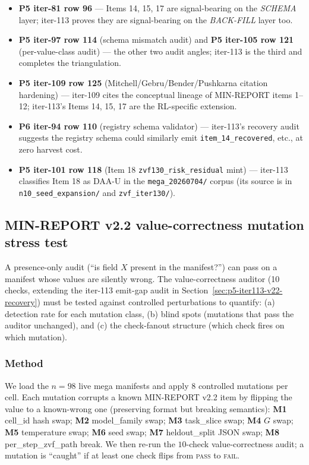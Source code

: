 \documentclass{article}  \usepackage[preprint,nonatbib]{neurips_2026} \usepackage[numbers]{natbib}
\begin{document}
\begin{itemize}
  \item \textbf{P5 iter-81 row 96} --- Items 14, 15, 17 are
        signal-bearing on the \emph{SCHEMA} layer; iter-113 proves they
        are signal-bearing on the \emph{BACK-FILL} layer too.
  \item \textbf{P5 iter-97 row 114} (schema mismatch audit) and
        \textbf{P5 iter-105 row 121} (per-value-class audit) --- the
        other two audit angles; iter-113 is the third and completes
        the triangulation.
  \item \textbf{P5 iter-109 row 125} (Mitchell/Gebru/Bender/Pushkarna
        citation hardening) --- iter-109 cites the conceptual lineage
        of MIN-REPORT items 1--12; iter-113's Items 14, 15, 17 are the
        RL-specific extension.
  \item \textbf{P6 iter-94 row 110} (registry schema validator) ---
        iter-113's recovery audit suggests the registry schema could
        similarly emit \texttt{item\_14\_recovered}, etc., at zero
        harvest cost.
  \item \textbf{P5 iter-101 row 118} (Item 18 \texttt{zvf130\_risk\_residual}
        mint) --- iter-113 classifies Item 18 as DAA-U in the
        \texttt{mega\_20260704/} corpus (its source is in
        \texttt{n10\_seed\_expansion/} and \texttt{zvf\_iter130/}).
\end{itemize} \subsection{MIN-REPORT v2.2 value-correctness mutation stress test}
\label{sec:p5-iter121-value-correctness}

A presence-only audit (``is field $X$ present in the manifest?'') can pass
on a manifest whose values are silently wrong. The value-correctness
auditor (10 checks, extending the iter-113 emit-gap audit in
Section~\ref{sec:p5-iter113-v22-recovery}) must be tested against
controlled perturbations to quantify: (a) detection rate for each
mutation class, (b) blind spots (mutations that pass the auditor
unchanged), and (c) the check-fanout structure (which check fires on
which mutation).

\subsubsection{Method}
We load the $n{=}98$ live mega manifests and apply $8$ controlled
mutations per cell. Each mutation corrupts a known MIN-REPORT v2.2 item
by flipping the value to a known-wrong one (preserving format but
breaking semantics): \textbf{M1} cell\_id hash swap; \textbf{M2}
model\_family swap; \textbf{M3} task\_slice swap;
\textbf{M4} $G$ swap; \textbf{M5} temperature swap;
\textbf{M6} seed swap; \textbf{M7} heldout\_split JSON swap;
\textbf{M8} per\_step\_zvf\_path break. We then re-run the
$10$-check value-correctness audit; a mutation is ``caught'' if at
least one check flips from \textsc{pass} to \textsc{fail}.
\end{document}
